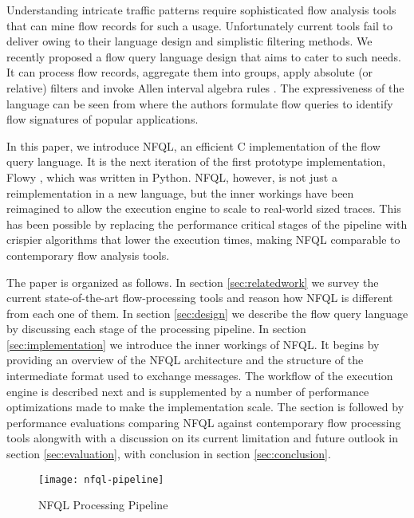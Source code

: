 Understanding intricate traffic patterns require sophisticated flow analysis
tools that can mine flow records for such a usage.  Unfortunately current
tools fail to deliver owing to their language design and simplistic filtering
methods.  We recently proposed a flow query language design
\cite{vmarinov:2009} that aims to cater to such needs.  It can process
flow records, aggregate them into groups, apply absolute (or relative) filters
and invoke Allen interval algebra rules \cite{fallen:1983}. The expressiveness
of the language can be seen from \cite{vperelman:2011} where the authors
formulate flow queries to identify flow signatures of popular applications.

In this paper, we introduce \ac{NFQL}, an efficient C implementation of the
flow query language. It is the next iteration of the first prototype
implementation, Flowy \cite{kkanev:2010}, which was written in Python.
\ac{NFQL}, however, is not just a reimplementation in a new language, but the
inner workings have been reimagined to allow the execution engine to scale to
real-world sized traces. This has been possible by replacing the performance
critical stages of the pipeline with crispier algorithms that lower the
execution times, making \ac{NFQL} comparable to contemporary flow analysis
tools.

The paper is organized as follows. In section \ref{sec:relatedwork} we survey
the current state-of-the-art flow-processing tools and reason how \ac{NFQL} is
different from each one of them. In section \ref{sec:design} we describe the
flow query language by discussing each stage of the processing pipeline. In
section \ref{sec:implementation} we introduce the inner workings of \ac{NFQL}.
It begins by providing an overview of the \ac{NFQL} architecture and the
structure of the intermediate format used to exchange messages. The workflow
of the execution engine is described next and is supplemented by a number of
performance optimizations made to make the implementation scale. The section
is followed by performance evaluations comparing \ac{NFQL} against
contemporary flow processing tools alongwith with a discussion on its current
limitation and future outlook in section \ref{sec:evaluation}, with conclusion
in section \ref{sec:conclusion}.

\begin{figure*}[!t]
\centering
\texttt{[image: nfql-pipeline]}
\caption{NFQL Processing Pipeline \cite{vmarinov:2009}}
\label{fig:nfql-pipeline}
\end{figure*}
